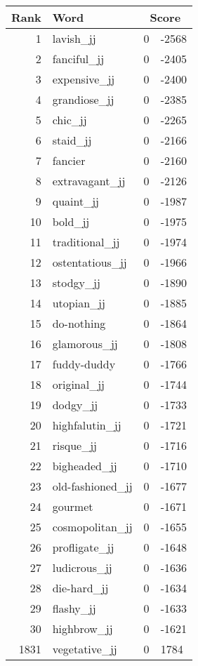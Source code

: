 \begin{longtable}[!htbp]{| rlr@{.}l |}
    \hline
    \textbf{Rank} & \textbf{Word} & \multicolumn{2}{c|}{\textbf{Score}} \\
    \hline
    \endhead
    1 & lavish\_jj & 0 & -2568 \\
    2 & fanciful\_jj & 0 & -2405 \\
    3 & expensive\_jj & 0 & -2400 \\
    4 & grandiose\_jj & 0 & -2385 \\
    5 & chic\_jj & 0 & -2265 \\
    6 & staid\_jj & 0 & -2166 \\
    7 & fancier & 0 & -2160 \\
    8 & extravagant\_jj & 0 & -2126 \\
    9 & quaint\_jj & 0 & -1987 \\
    10 & bold\_jj & 0 & -1975 \\
    11 & traditional\_jj & 0 & -1974 \\
    12 & ostentatious\_jj & 0 & -1966 \\
    13 & stodgy\_jj & 0 & -1890 \\
    14 & utopian\_jj & 0 & -1885 \\
    15 & do-nothing & 0 & -1864 \\
    16 & glamorous\_jj & 0 & -1808 \\
    17 & fuddy-duddy & 0 & -1766 \\
    18 & original\_jj & 0 & -1744 \\
    19 & dodgy\_jj & 0 & -1733 \\
    20 & highfalutin\_jj & 0 & -1721 \\
    21 & risque\_jj & 0 & -1716 \\
    22 & bigheaded\_jj & 0 & -1710 \\
    23 & old-fashioned\_jj & 0 & -1677 \\
    24 & gourmet & 0 & -1671 \\
    25 & cosmopolitan\_jj & 0 & -1655 \\
    26 & profligate\_jj & 0 & -1648 \\
    27 & ludicrous\_jj & 0 & -1636 \\
    28 & die-hard\_jj & 0 & -1634 \\
    29 & flashy\_jj & 0 & -1633 \\
    30 & highbrow\_jj & 0 & -1621 \\
    1831 & vegetative\_jj & 0 & 1784 \\

\end{longtable}
